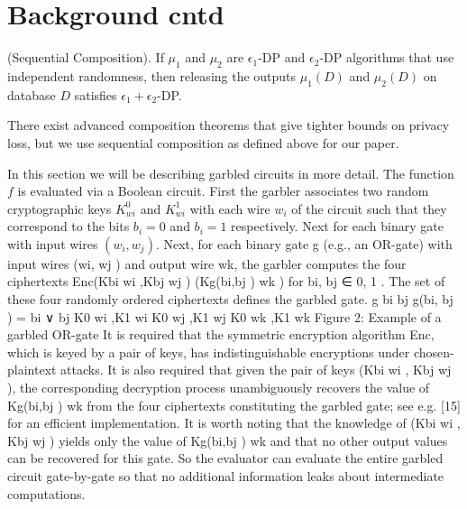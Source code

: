 \section{Background cntd}
\begin{theorem}(Sequential Composition). If $\mu_1$ and
$\mu_2$ are $\epsilon_1$-DP and $\epsilon_2$-DP algorithms that use independent randomness, then releasing the outputs $\mu_1(D)$ and
$\mu_2(D)$ on database $D$ satisfies $\epsilon_1+\epsilon_2$-DP.\end{theorem} There exist advanced composition theorems that give tighter
bounds on privacy loss, but we
use sequential composition as defined above for our paper.

In this section we will be describing garbled circuits in more detail. The function $f$ is evaluated via a Boolean circuit.
 First the garbler associates  two random cryptographic keys $K_{wi}^0$ and $K^1_{wi}$ with each wire $w_i$ of the circuit such that they correspond to the bits $b_i=0$ and $b_i=1$ respectively. Next for each binary gate with input wires $(w_i,w_j)$. Next, for each binary gate g (e.g., an OR-gate)
with input wires (wi, wj ) and output wire wk, the garbler
computes the four ciphertexts
Enc(Kbi wi ,Kbj
wj )
(Kg(bi,bj ) wk ) for bi, bj ∈ {0, 1} .
The set of these four randomly ordered ciphertexts defines
the garbled gate.
g bi
bj g(bi, bj ) = bi ∨ bj
K0
wi ,K1
wi
K0
wj ,K1
wj
K0
wk ,K1
wk
Figure 2: Example of a garbled OR-gate
It is required that the symmetric encryption algorithm
Enc, which is keyed by a pair of keys, has indistinguishable encryptions under chosen-plaintext attacks. It is also
required that given the pair of keys (Kbi
wi , Kbj
wj ), the corresponding decryption process unambiguously recovers the
value of Kg(bi,bj ) wk from the four ciphertexts constituting the
garbled gate; see e.g. [15] for an efficient implementation.
It is worth noting that the knowledge of (Kbi
wi , Kbj
wj ) yields
only the value of Kg(bi,bj ) wk and that no other output values
can be recovered for this gate. So the evaluator can evaluate
the entire garbled circuit gate-by-gate so that no additional
information leaks about intermediate computations.


